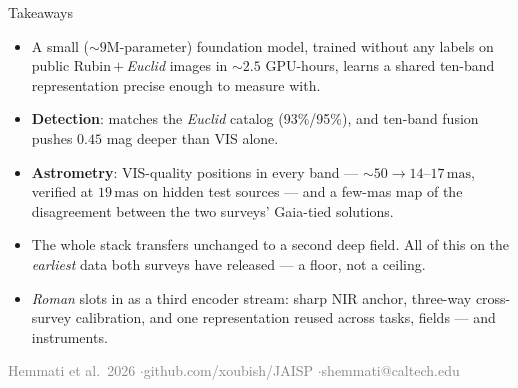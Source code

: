 \documentclass[aspectratio=169,10pt]{beamer}
\newcommand{\mas}{\,\mathrm{mas}}
\newcommand{\srcnote}[1]{{\tiny\textcolor{gray}{#1}}}
\begin{document}
\begin{frame}{Takeaways}
  \begin{itemize}\setlength\itemsep{0.9em}
    \item A small (${\sim}9$M-parameter) foundation model, trained \alert{without any labels}
      on public Rubin\,$+$\,\textit{Euclid} images in ${\sim}2.5$ GPU-hours, learns a shared
      ten-band representation precise enough to measure with.
    \item \textbf{Detection}: matches the \textit{Euclid} catalog (93\%/95\%), and ten-band fusion
      pushes \alert{$0.45$ mag deeper} than VIS alone.
    \item \textbf{Astrometry}: VIS-quality positions in every band --- ${\sim}50 \to 14$--$17\mas$,
      verified at $19\mas$ on hidden test sources --- and a few-mas \alert{map of the
      disagreement} between the two surveys' Gaia-tied solutions.
    \item The whole stack \alert{transfers unchanged} to a second deep field. All of this on the
      \emph{earliest} data both surveys have released --- a floor, not a ceiling.
    \item \textit{Roman} slots in as a \alert{third encoder stream}: sharp NIR anchor, three-way
      cross-survey calibration, and one representation reused across tasks, fields ---
      and instruments.
  \end{itemize}
  \vfill
  \centering
  \srcnote{Hemmati et al.\ 2026 \quad$\cdot$\quad github.com/xoubish/JAISP \quad$\cdot$\quad shemmati@caltech.edu}
\end{frame}
\end{document}
